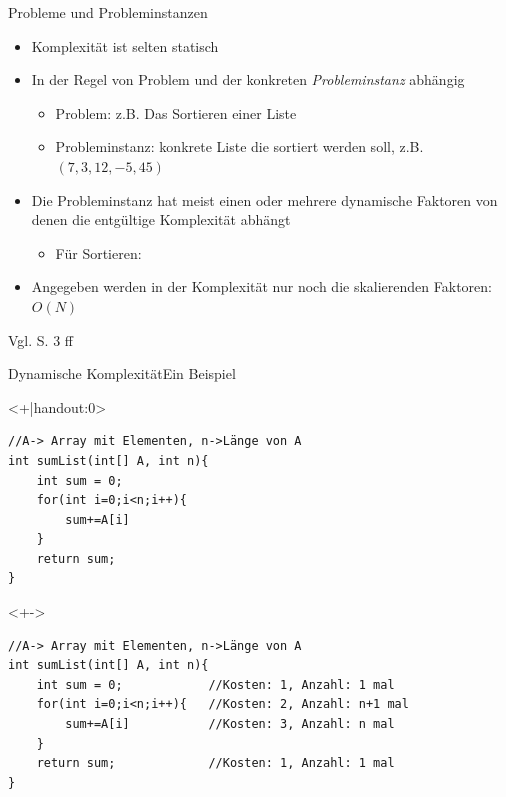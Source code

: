 \begin{frame}{Probleme und Probleminstanzen}
    \begin{itemize}[<+->]
        \item Komplexität ist selten statisch
        \item In der Regel von Problem und der konkreten \textit{Probleminstanz} abhängig
        \begin{itemize}
            \item Problem: z.B. Das Sortieren einer Liste
            \item Probleminstanz: konkrete Liste die sortiert werden soll, z.B. $(7, 3, 12, -5, 45)$
        \end{itemize}
        \item Die Probleminstanz hat meist einen oder mehrere dynamische Faktoren von denen die entgültige Komplexität abhängt
        \begin{itemize}
            \item Für Sortieren: 
        \end{itemize}
        \item Angegeben werden in der Komplexität nur noch die skalierenden Faktoren: $O(N)$
    \end{itemize}
    
    Vgl. \cite{ottmann2017} S. 3 ff
\end{frame}

\begin{frame}[fragile]{Dynamische Komplexität}{Ein Beispiel}
\lstset{style=java}
\begin{onlyenv}<+|handout:0>
\begin{lstlisting}
//A-> Array mit Elementen, n->Länge von A
int sumList(int[] A, int n){
    int sum = 0;
    for(int i=0;i<n;i++){
        sum+=A[i]
    }
    return sum;
}
\end{lstlisting}
\end{onlyenv}

\begin{onlyenv}<+->
\begin{lstlisting}
//A-> Array mit Elementen, n->Länge von A
int sumList(int[] A, int n){
    int sum = 0;            //Kosten: 1, Anzahl: 1 mal
    for(int i=0;i<n;i++){   //Kosten: 2, Anzahl: n+1 mal
        sum+=A[i]           //Kosten: 3, Anzahl: n mal
    }
    return sum;             //Kosten: 1, Anzahl: 1 mal
}
\end{lstlisting}
\end{onlyenv}





\end{frame}


